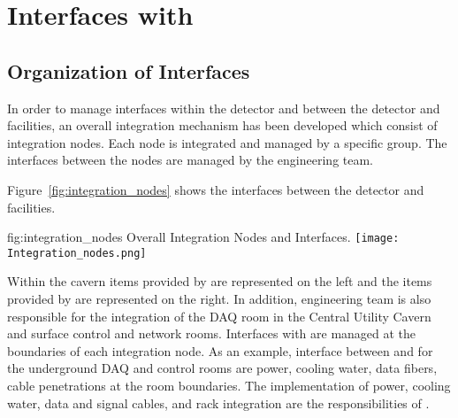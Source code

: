\chapter{Interfaces with }
\label{vl:tc-lbnf}

\section{Organization of Interfaces}
\label{sec:inter-org-interf}
In order to manage interfaces within the detector and between the
detector and facilities, an overall integration mechanism has been
developed which consist of integration nodes. Each node is integrated
and managed by a specific group. The interfaces between the nodes are
managed by the  engineering team.

Figure~\ref{fig:integration_nodes} shows the interfaces between the
detector and facilities.
\begin{dunefigure}{fig:integration_nodes}
  {Overall Integration Nodes and Interfaces.}
  \texttt{[image: Integration\_nodes.png]}
\end{dunefigure}
Within the cavern items provided by  are
represented on the left and the items provided by  are represented
on the right. In addition,  engineering team is also
responsible for the integration of the DAQ room in the Central Utility
Cavern and surface control and network rooms. Interfaces with  are
managed at the boundaries of each integration node. As an example,
interface between  and  for the underground DAQ and control
rooms are power, cooling water, data fibers, cable penetrations at the
room boundaries. The implementation of power, cooling water, data and
signal cables, and rack integration are the responsibilities of .


